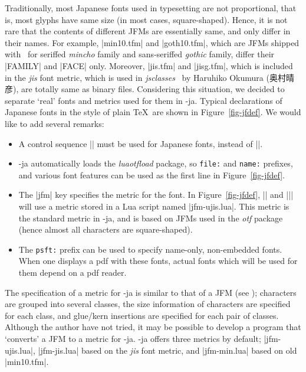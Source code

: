\documentclass{ajt}
\begin{document}
Traditionally, most Japanese fonts used in typesetting are not
proportional, that is, most glyphs have same size (in most cases,
square-shaped). Hence, it is not rare that the contents of different
JFMs are essentially same, and only differ in their names. For example,
|min10.tfm| and |goth10.tfm|, which are JFMs shipped with \pTeX\ for
seriffed \emph{mincho} family and sans-seriffed \emph{gothic} family,
differ their |FAMILY| and |FACE| only. Moreover, |jis.tfm| and
|jisg.tfm|, which is included in the \emph{jis} font metric, which is
used in \emph{jsclasses}~\cite{jsclasses} by Haruhiko Okumura (奥村晴彦),
are totally same as binary files.  Considering this situation, we
decided to separate `real' fonts and metrics used for them in
\LuaTeX-ja. Typical declarations of Japanese fonts in the style of plain
\TeX\ are shown in Figure~\ref{fig-jfdef}. We would like to add several
remarks:
\begin{itemize}
\item A control sequence |\jfont| must be used for Japanese fonts, instead of |\font|.
\item \LuaTeX-ja automatically loads the \emph{luaotfload} package, so
      \hbox{\tt file:} and \hbox{\tt name:} prefixes, and various font features can be
      used as the first line in Figure~\ref{fig-jfdef}.
\item The |jfm| key specifies the metric for the font. In
      Figure~\ref{fig-jfdef}, |\foo| and |\bar| will use a metric stored in a
      Lua script named |jfm-ujis.lua|. This metric is the standard
      metric in \LuaTeX-ja, and is based on JFMs used in the \emph{otf}
      package~\cite{otf} (hence almost all characters are square-shaped).
\item The \hbox{\tt psft:} prefix can be used to specify name-only, non-embedded
      fonts. When one displays a pdf with these fonts, actual fonts which
      will be used for them depend on a pdf reader. 
\end{itemize}
The specification of a metric for \LuaTeX-ja is similar to that of a JFM
(see \cite{ptexjp}); characters are grouped into several classes, the
size information of characters are specified for each class, and
glue/kern insertions are specified for each pair of classes. Although
the author have not tried, it may be possible to develop a program that
`converts' a JFM to a metric for \LuaTeX-ja.  \LuaTeX-ja offers three
metrics by default; |jfm-ujis.lua|, |jfm-jis.lua| based on the
\emph{jis} font metric, and |jfm-min.lua| based on old |min10.tfm|.
\end{document}
